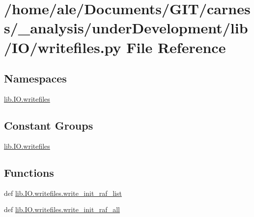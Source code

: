 \hypertarget{a00051}{\section{/home/ale/\-Documents/\-G\-I\-T/carness/\-\_\-analysis/under\-Development/lib/\-I\-O/writefiles.py File Reference}
\label{a00051}
}
\subsection*{Namespaces}
\begin{DoxyCompactItemize}
\item 
\hyperlink{a00110}{lib.\-I\-O.\-writefiles}
\end{DoxyCompactItemize}
\subsection*{Constant Groups}
\begin{DoxyCompactItemize}
\item 
\hyperlink{a00110}{lib.\-I\-O.\-writefiles}
\end{DoxyCompactItemize}
\subsection*{Functions}
\begin{DoxyCompactItemize}
\item 
def \hyperlink{a00110_a33a9a95566de3841055c5dbf7fdc3505}{lib.\-I\-O.\-writefiles.\-write\-\_\-init\-\_\-raf\-\_\-list}
\item 
def \hyperlink{a00110_ad13fc2e762b8deaeb661f939e26e706f}{lib.\-I\-O.\-writefiles.\-write\-\_\-init\-\_\-raf\-\_\-all}
\end{DoxyCompactItemize}
